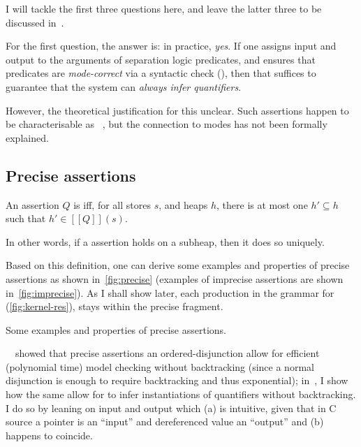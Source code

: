 I will tackle the first three questions here, and leave the latter three
to be discussed in~.

For the first question, the answer is: in practice, \emph{yes}. If one assigns
input and output  to the arguments of separation logic predicates,
and ensures that predicates are \emph{mode-correct} via a syntactic check
(), then that suffices to guarantee that the system
can \emph{always infer quantifiers}.

However, the theoretical justification for this unclear. Such assertions happen
to be characterisable as ~, but the
connection to modes has not been formally explained.

\subsection{Precise assertions}\label{subsec:precise-assertion}

\begin{definition}%
\label{def:precise-assertion}
    \AP{} An assertion $Q$ is  iff, for all stores $s$, and heaps
    $h$, there is at most one $h' \subseteq{} h$ such that $h' \in [\![ Q ]\!] (s)$.

    In other words, if a  assertion holds on a subheap, then it
    does so uniquely.
\end{definition}

Based on this definition, one can derive some examples and properties of
precise assertions as shown in~\cref{fig:precise} (examples of imprecise
assertions are shown in~\cref{fig:imprecise}). As I shall show later, each
production in the grammar for  
(\cref{fig:kernel-res}), stays within the precise fragment.

\begin{marginfigure}
\small%
%
\caption{Some examples and properties of precise assertions.}\label{fig:precise}
\end{marginfigure}

\citeauthor{brotherston2016model}~~showed that
precise assertions an ordered-disjunction allow for efficient (polynomial time)
model checking without backtracking (since a normal disjunction is enough to
require backtracking and thus exponential); in~, I
show how the same allow for  to infer instantiations of quantifiers
without backtracking. I do so by leaning on input and output  which
(a) is intuitive, given that in C source a pointer is an ``input'' and
dereferenced value an ``output'' and (b) happens to coincide.

